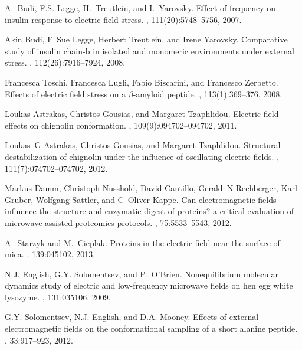 \documentclass[a4paper,preprint,unsortedaddress,onecolumn]{revtex4-1}
\begin{document}
\begin{thebibliography}{10}
A.~Budi, F.S. Legge, H.~Treutlein, and I.~Yarovsky.
\newblock Effect of frequency on insulin response to electric field stress.
, 111(20):5748--5756, 2007.

Akin Budi, F~Sue Legge, Herbert Treutlein, and Irene Yarovsky.
\newblock Comparative study of insulin chain-b in isolated and monomeric
  environments under external stress.
, 112(26):7916--7924, 2008.

Francesca Toschi, Francesca Lugli, Fabio Biscarini, and Francesco Zerbetto.
\newblock Effects of electric field stress on a $\beta$-amyloid peptide.
, 113(1):369--376, 2008.

Loukas Astrakas, Christos Gousias, and Margaret Tzaphlidou.
\newblock Electric field effects on chignolin conformation.
, 109(9):094702--094702, 2011.

Loukas~G Astrakas, Christos Gousias, and Margaret Tzaphlidou.
\newblock Structural destabilization of chignolin under the influence of
  oscillating electric fields.
, 111(7):074702--074702, 2012.

Markus Damm, Christoph Nusshold, David Cantillo, Gerald~N Rechberger, Karl
  Gruber, Wolfgang Sattler, and C~Oliver Kappe.
\newblock Can electromagnetic fields influence the structure and enzymatic
  digest of proteins? a critical evaluation of microwave-assisted proteomics
  protocols.
, 75:5533--5543, 2012.

A.~Starzyk and M.~Cieplak.
\newblock Proteins in the electric field near the surface of mica.
, 139:045102, 2013.

N.J. English, G.Y. Solomentsev, and P.~O'Brien.
\newblock Nonequilibrium molecular dynamics study of electric and low-frequency
  microwave fields on hen egg white lysozyme.
, 131:035106, 2009.

G.Y. Solomentsev, N.J. English, and D.A. Mooney.
\newblock Effects of external electromagnetic fields on the conformational
  sampling of a short alanine peptide.
, 33:917--923, 2012.


\end{thebibliography}
\end{document}
